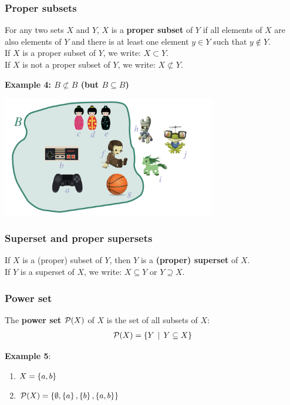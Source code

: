 \documentclass[fleqn,10pt,serif,xcolor=svgnames,xcolor=table,aspectratio=169,handout]{beamer}
\begin{document}
\begin{frame}
  \frametitle{Proper subsets}

  For any two sets $X$ and $Y$, $X$ is a \textbf{proper subset} of $Y$ if all elements of $X$ are also elements of $Y$ and there is at least one element $y \in Y$ such that $y \not \in Y$.\\
  If $X$ is a proper subset of $Y$, we write: $X \subset Y$.\\
  If $X$ is not a proper subset of $Y$, we write: $X \not \subset Y$.



  \hfill \textbf{Example 4: $B \not \subset B$ (but $B \subseteq B$)}

  \hfill \includegraphics[width = 0.7\textwidth]{01b-sets-relations-operations/01b-sets-relations-operations-003.jpeg}

\end{frame}

\begin{frame}
  \frametitle{Superset and proper supersets}
  If $X$ is a (proper) subset of $Y$, then $Y$ is a \textbf{(proper) superset} of $X$.\\
  If $Y$ is a superset of $X$, we write: $X \subseteq Y$ or $Y \supseteq X$.
\end{frame}

\begin{frame}

\frametitle{Power set}

  The \textbf{power set} $\mathcal{P}(X)$ of $X$ is the set of all subsets of $X$:
  \begin{align*}
    \mathcal{P}(X) = \left\{Y \thinspace \mid \thinspace Y \subseteq X\right\}
  \end{align*}

  \bigskip

  \textbf{Example 5}:

    \begin{enumerate}[]
      \item $X = \left\{a,b\right\}$
      \item $\mathcal{P}(X) = \left\{\emptyset, \left\{a\right\}, \left\{b\right\}, \left\{a,b\right\}\right\}$
    \end{enumerate}

\end{frame}
\end{document}
